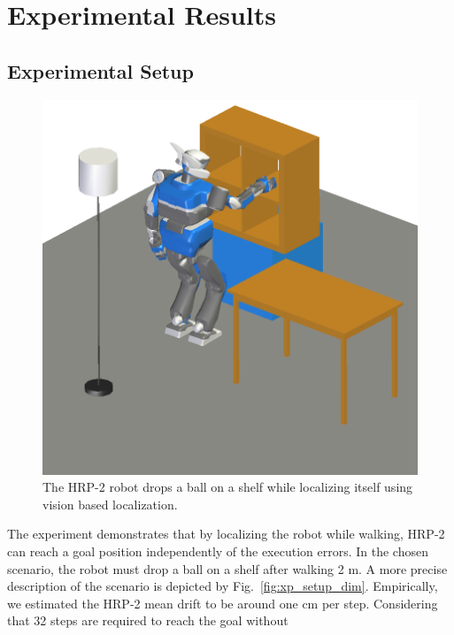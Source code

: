 \section{Experimental Results}\label{sec:results}

\subsection{Experimental Setup}\label{sec:xp_setup}
%
\begin{figure}[ht!] %
  \begin{center}
    \includegraphics[width=\linewidth]{images/trajectory-8.png}
  \end{center}
  \caption{The HRP-2 robot drops a ball on a shelf while localizing
    itself using vision based localization. \label{fig:xp_setup_screenshot}}
\end{figure}
%
The experiment demonstrates that by localizing the robot while
walking, HRP-2 can reach a goal position independently of the
execution errors. In the chosen scenario, the robot must drop a ball
on a shelf after walking 2 m. A more precise description of the
scenario is depicted by Fig.~\ref{fig:xp_setup_dim}. Empirically, we
estimated the HRP-2 mean drift to be around one cm per
step. Considering that 32 steps are required to reach the goal without
